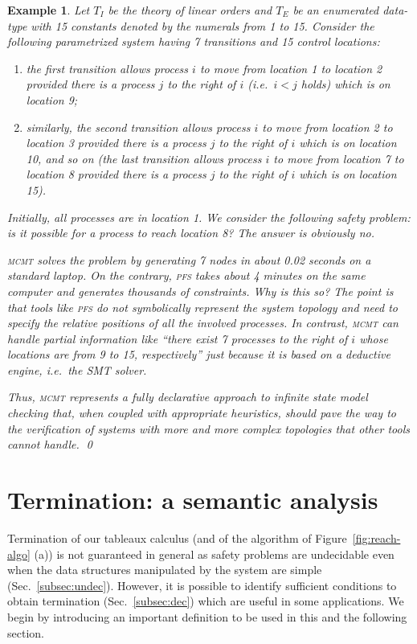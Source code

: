 \documentclass{LMCS}
\theoremstyle{plain}\newtheorem{assumption}[thm]{Assumption}
\theoremstyle{plain}\newtheorem{proposition}[thm]{Proposition}
\theoremstyle{plain}\newtheorem{property}[thm]{Property}
\theoremstyle{plain}\newtheorem{example}[thm]{Example}
\theoremstyle{plain}\newtheorem{claim}[thm]{Claim}
\theoremstyle{plain}\newtheorem{lemma}[thm]{Lemma}
\begin{document}
\begin{example}\em Let $T_I$ be the theory of linear orders and $T_E$ be an
  enumerated data-type with 15 constants denoted by the numerals from
  1 to 15.  Consider the following parametrized system having 7
  transitions and 15 control locations:
  \begin{enumerate}[$\bullet$]
  \item the first transition allows process $i$ to move from location
    1 to location 2 provided there is a process $j$ to the right of
    $i$ (i.e.\ $i<j$ holds) which is on location 9;
  \item similarly, the second transition allows process $i$ to move
    from location 2 to location 3 provided there is a process $j$ to
    the right of $i$ which is on location 10, and so on (the last
    transition allows process $i$ to move from location 7 to location
    8 provided there is a process $j$ to the right of $i$ which is on
    location 15).
  \end{enumerate}
  Initially, all processes are in location 1.  We consider the
  following safety problem: is it possible for a process to reach
  location 8? The answer is obviously no.

  \textsc{mcmt} solves the problem by generating 7 nodes in about 0.02
  seconds on a standard laptop.
On the contrary, \textsc{pfs} takes about 4 minutes on the same
  computer and generates thousands of constraints.  Why is this so?
  The point is that tools like \textsc{pfs}
do not symbolically represent the system topology and need to
  specify the relative positions of all the involved processes.  In
  contrast, \textsc{mcmt} can handle partial information like ``there
  exist 7 processes to the right of $i$ whose locations are from 9 to
  15, respectively'' just because it is based on a deductive engine,
  i.e.\ the SMT solver.

  Thus, \textsc{mcmt} represents a fully declarative approach to
  infinite state model checking that, when coupled with appropriate
  heuristics, should pave the way to the verification of systems with
  more and more complex topologies that other tools cannot
  handle. \qed
\end{example}

\section{Termination: a semantic analysis}
\label{sec:term}
Termination of our tableaux calculus (and of the algorithm of
Figure~\ref{fig:reach-algo} (a)) is not guaranteed in general as
safety problems are undecidable even when the data structures
manipulated by the system are simple (Sec.~\ref{subsec:undec}).
However, it is possible to identify sufficient conditions to obtain
termination (Sec.~\ref{subsec:dec}) which are useful in some
applications.  We begin by introducing an important definition to be
used in this and the following section.
\end{document}

